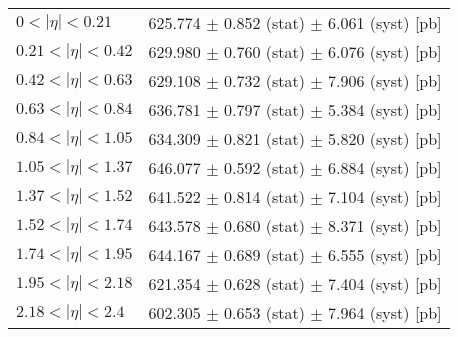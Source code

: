 \begin{tabular}{lc}
\hline
\hline
$0 < |\eta| <0.21$             & 625.774 $\pm$ 0.852 (stat) $\pm$ 6.061 (syst) [pb]  \\
$0.21 < |\eta| <0.42$          & 629.980 $\pm$ 0.760 (stat) $\pm$ 6.076 (syst) [pb]  \\
$0.42 < |\eta| <0.63$          & 629.108 $\pm$ 0.732 (stat) $\pm$ 7.906 (syst) [pb]  \\
$0.63 < |\eta| <0.84$          & 636.781 $\pm$ 0.797 (stat) $\pm$ 5.384 (syst) [pb]  \\
$0.84 < |\eta| <1.05$          & 634.309 $\pm$ 0.821 (stat) $\pm$ 5.820 (syst) [pb]  \\
$1.05 < |\eta| <1.37$          & 646.077 $\pm$ 0.592 (stat) $\pm$ 6.884 (syst) [pb]  \\
$1.37 < |\eta| <1.52$          & 641.522 $\pm$ 0.814 (stat) $\pm$ 7.104 (syst) [pb]  \\
$1.52 < |\eta| <1.74$          & 643.578 $\pm$ 0.680 (stat) $\pm$ 8.371 (syst) [pb]  \\
$1.74 < |\eta| <1.95$          & 644.167 $\pm$ 0.689 (stat) $\pm$ 6.555 (syst) [pb]  \\
$1.95 < |\eta| <2.18$          & 621.354 $\pm$ 0.628 (stat) $\pm$ 7.404 (syst) [pb]  \\
$2.18 < |\eta| <2.4$           & 602.305 $\pm$ 0.653 (stat) $\pm$ 7.964 (syst) [pb]  \\
\hline
\hline
\end{tabular}

